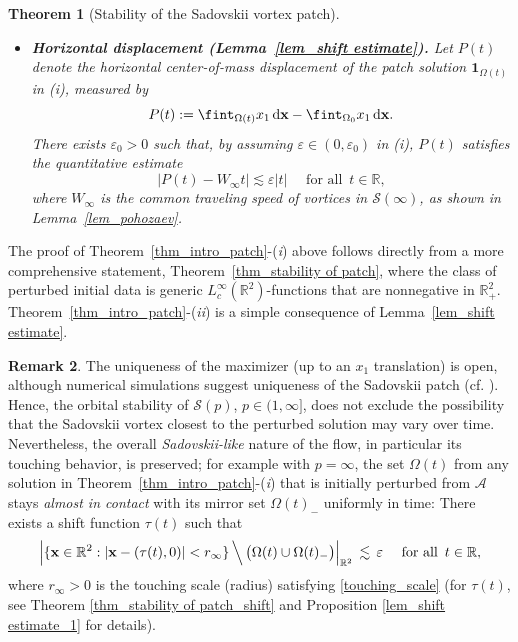 \documentclass[11pt]{amsart}
\newtheorem{theorem}{Theorem}[section]
\theoremstyle{definition}
\theoremstyle{definition}
\newtheorem{remark}[theorem]{Remark}
\numberwithin{equation}{section}
\newcommand{\0}{\emptyset}
\newcommand{\Omg}{\Omega}
\newcommand{\bfx}{{\bf x}}
\newcommand{\bbR}{\mathbb R}
\newcommand{\calS}{\mathcal S}
\newcommand{\dd}{\mathrm{d}}
\newcommand{\bfone}{\mathbf1}
\newcommand{\ift}{\infty}
\begin{document}
\begin{theorem}[Stability of the Sadovskii vortex patch]
\begin{itemize}[itemsep=1em, topsep=1em]
			\item[(ii)]\textbf{Horizontal displacement {(Lemma~\ref{lem_shift estimate})}.}
			Let $P(t)$ denote the horizontal center-of-mass displacement of the patch solution $\bfone_{\Omega(t)}$ in (i), measured by
			\[
			P(t) := \fint_{\Omega(t)} x_1 \,\dd \bfx - \fint_{\Omega_0} x_1 \, \dd \bfx.
			\]
			There exists $\varepsilon_0 > 0$ such that, by assuming $\varepsilon \in (0,\varepsilon_0)$ in (i), $P(t)$ satisfies the quantitative estimate
			\begin{equation}\label{est_shift_intro}
				|P(t)-W_\ift t| \lesssim \varepsilon |t|
				\quad \textrm{ for all }\, t\in\bbR,
			\end{equation}
			where $W_\ift$ is the {common} traveling speed of vortices in $\calS(\ift)${, as shown in Lemma~\ref{lem_pohozaev}}.
		\end{itemize}
	\end{theorem}
	
	The proof of Theorem~\ref{thm_intro_patch}-(\textit{i}) above follows directly from a more comprehensive statement, Theorem~\ref{thm_stability of patch}, where the class of perturbed initial data is generic $L^\ift_c(\bbR^2)$-functions that are nonnegative in $\bbR^2_+$.
	Theorem~\ref{thm_intro_patch}-(\textit{ii}) is a simple consequence of Lemma~\ref{lem_shift estimate}.
	
	
	\begin{remark}
		The uniqueness of the maximizer (up to an $x_1$ translation) is open, although numerical simulations suggest uniqueness of the Sadovskii patch (cf. \cite{HT2025}).
		Hence, the {orbital} stability of $\calS(p)$, $p \in (1,\infty]$, does not exclude the possibility that the Sadovskii vortex closest to the perturbed solution may vary over time.
		Nevertheless, the overall \textit{Sadovskii-like} nature of the flow, in particular its touching behavior, is preserved; for example with $p=\infty$, the set $\Omg(t)$ from any  solution  in Theorem~\ref{thm_intro_patch}-(\textit{i}) that is initially perturbed from $\mathscr{A}$ stays \emph{almost in contact} with its mirror set $\Omg(t)_-$ uniformly in time: 
		There exists a shift function $\tau(t)$ such that 
		$$
		\Big|\{
		\bfx\in\bbR^2:|\bfx-(\tau(t),0)|<r_\infty\}
		\,\Big\backslash\,\big(\Omg(t)\cup\Omg(t)_-\big)\Big|_{\bbR^2}\,\lesssim\,\varepsilon \quad \mbox{ for all }\,t\in\bbR,
		$$
		where  $r_\infty>0$ is the touching scale (radius)    satisfying \eqref{touching_scale} (for $\tau(t)$, see Theorem \ref{thm_stability of patch_shift} and Proposition \ref{lem_shift estimate_1} for details).
	\end{remark}
	
\end{document}
